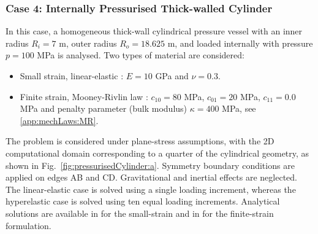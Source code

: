 \documentclass[review,3p]{elsarticle}
\begin{document}
\subsubsection{Case 4: Internally Pressurised Thick-walled Cylinder}
\label{case:Thick-walled_Cylinder}
%
In this case, a homogeneous thick-wall cylindrical pressure vessel with an inner radius $R_i = 7$ m, outer radius $R_o = 18.625$ m, and loaded internally with pressure $p = 100$ MPa is analysed. Two types of material are considered:
\begin{itemize}
	\item[i.] Small strain, linear-elastic \cite{Bijelonja2006}: $E=10$ GPa and $\nu=0.3$.
	\item[ii.] Finite strain, Mooney-Rivlin law \cite{Bijelonja2005a}: $c_{10} = 80$ MPa, $c_{01} = 20$ MPa, $c_{11} = 0.0$ MPa and penalty parameter (bulk modulus) $\kappa=400$ MPa, see \ref{app:mechLaws:MR}.
\end{itemize}
The problem is considered under plane-stress assumptions, with the 2D computational domain corresponding to a quarter of the cylindrical geometry, as shown in Fig.~\ref{fig:pressurisedCylinder:a}. Symmetry boundary conditions are applied on edges AB and CD. Gravitational and inertial effects are neglected. The linear-elastic case is solved using a single loading increment, whereas the hyperelastic case is solved using ten equal loading increments. Analytical solutions are available in \cite{Timoshenko1970} for the small-strain and in \cite{Green1992} for the finite-strain formulation.
\end{document}
